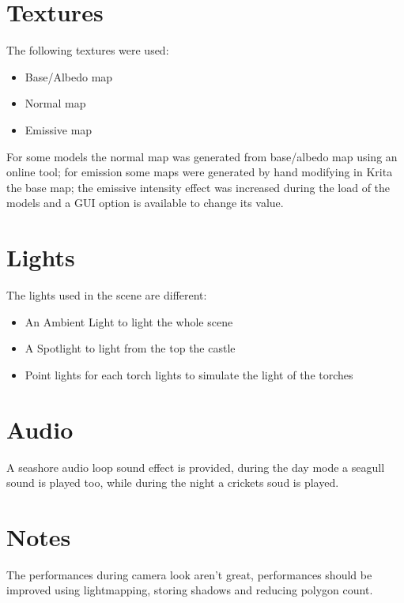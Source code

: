 \documentclass[10pt,a4paper]{article}
\begin{document}
\section{Textures}
The following textures were used:

\begin{itemize}
\item Base/Albedo map
\item Normal map
\item Emissive map
\end{itemize}

For some models the normal map was generated from base/albedo map using an online tool; for emission some maps were generated by hand modifying in Krita the base map; the emissive intensity effect was increased during the load of the models and a GUI option is available to change its value.

\section{Lights}
The lights used in the scene are different:

\begin{itemize}
\item An Ambient Light to light the whole scene
\item A Spotlight to light from the top the castle
\item Point lights for each torch lights to simulate the light of the torches
\end{itemize}

\section{Audio}

A seashore audio loop sound effect is provided, during the day mode a seagull sound is played too, while during the night a crickets soud is played.

\section{Notes}

The performances during camera look aren't great, performances should be improved  using lightmapping, storing shadows and reducing polygon count.
\end{document}
